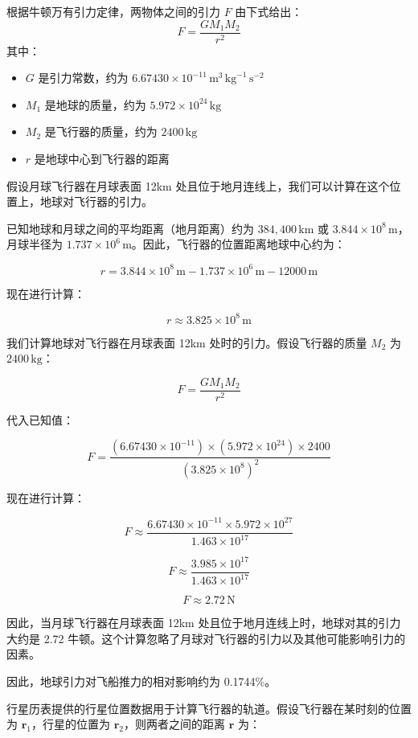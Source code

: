 \documentclass{ctexart}
\begin{document}
根据牛顿万有引力定律，两物体之间的引力 \( F \) 由下式给出：
\[
F = \frac{G M_1 M_2}{r^2}
\]
其中：
\begin{itemize}
    \item \( G \) 是引力常数，约为 \( 6.67430 \times 10^{-11} \, \text{m}^3 \, \text{kg}^{-1} \, \text{s}^{-2} \)
    \item \( M_1 \) 是地球的质量，约为 \( 5.972 \times 10^{24} \, \text{kg} \)
    \item \( M_2 \) 是飞行器的质量，约为 \( 2400 \, \text{kg} \)
    \item \( r \) 是地球中心到飞行器的距离
\end{itemize}

假设月球飞行器在月球表面 12km 处且位于地月连线上，我们可以计算在这个位置上，地球对飞行器的引力。

已知地球和月球之间的平均距离（地月距离）约为 \( 384,400 \, \text{km} \) 或 \( 3.844 \times 10^8 \, \text{m} \)，月球半径为 \( 1.737 \times 10^6 \, \text{m} \)。因此，飞行器的位置距离地球中心约为：

\[
r = 3.844 \times 10^8 \, \text{m} - 1.737 \times 10^6 \, \text{m} - 12000 \, \text{m}
\]

现在进行计算：

\[
r \approx 3.825 \times 10^8 \, \text{m}
\]

我们计算地球对飞行器在月球表面 12km 处时的引力。假设飞行器的质量 \( M_2 \) 为 \( 2400 \, \text{kg} \)：

\[
F = \frac{G M_1 M_2}{r^2}
\]

代入已知值：

\[
F = \frac{(6.67430 \times 10^{-11}) \times (5.972 \times 10^{24}) \times 2400}{(3.825 \times 10^8)^2}
\]

现在进行计算：

\[
F \approx \frac{6.67430 \times 10^{-11} \times 5.972 \times 10^{27}}{1.463 \times 10^{17}}
\]

\[
F \approx \frac{3.985 \times 10^{17}}{1.463 \times 10^{17}}
\]

\[
F \approx 2.72 \, \text{N}
\]

因此，当月球飞行器在月球表面 12km 处且位于地月连线上时，地球对其的引力大约是 2.72 牛顿。这个计算忽略了月球对飞行器的引力以及其他可能影响引力的因素。

因此，地球引力对飞船推力的相对影响约为 0.1744\%。

行星历表提供的行星位置数据用于计算飞行器的轨道。假设飞行器在某时刻的位置为 \( \mathbf{r}_1 \)，行星的位置为 \( \mathbf{r}_2 \)，则两者之间的距离 \( \mathbf{r} \) 为：
\end{document}

